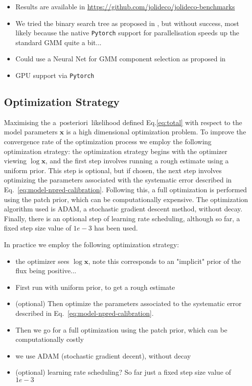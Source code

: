 \documentclass[twocolumn]{aastex631}
\newcommand{\aposteriori}{a~posteriori~}
\begin{document}
    \begin{itemize}
        \item Results are available in \url{https://github.com/jolideco/jolideco-benchmarks}
        \item We tried the binary search tree as proposed in \cite{Parameswaran2018},
        but without success, most likely because the native \texttt{Pytorch} support
        for parallelisation speeds up the standard GMM quite a bit...
        \item Could use a Neural Net for GMM component selection as proposed in \cite{Rosenbaum15}
        \item GPU support via \texttt{Pytorch}

    \end{itemize}

    \subsection{Optimization Strategy}
    Maximising the \aposteriori likelihood defined Eq.\ref{eq:total} with respect to the model parameters $\mathbf{x}$ is a high dimensional optimization problem. To improve the convergence rate of the optimization process we employ the following optimization strategy: the optimization strategy begins with the optimizer viewing $\log{\mathbf{x}}$, and the first step involves running a rough estimate using a uniform prior. This step is optional, but if chosen, the next step involves optimizing the parameters associated with the systematic error described in Eq.~\ref{eq:model-npred-calibration}. Following this, a full optimization is performed using the patch prior, which can be computationally expensive. The optimization algorithm used is ADAM, a stochastic gradient descent method, without decay. Finally, there is an optional step of learning rate scheduling, although so far, a fixed step size value of $1e-3$ has been used.
    
    In practice we employ the following optimization strategy:
    \begin{itemize}
        \item the optimizer sees $\log{\mathbf{x}}$, note this corresponds to an "implicit" prior of the flux being positive...
        \item First run with uniform prior, to get a rough estimate
        \item (optional) Then optimize the parameters associated to the systematic error described in Eq.~\ref{eq:model-npred-calibration}.
        \item Then we go for a full optimization using the patch prior, which can be computationally costly
        \item we use ADAM (stochastic gradient decent), without decay
        \item  (optional) learning rate scheduling? So far just a fixed step size value of $1e-3$
    \end{itemize}
    
\end{document}
